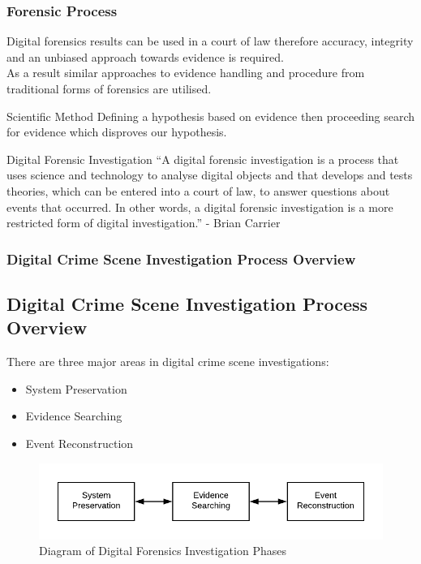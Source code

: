 \documentclass{beamer}
\begin{document}
\begin{frame}
	\frametitle{Forensic Process}
	Digital forensics results can be used in a court of law therefore accuracy, integrity and an unbiased approach towards evidence is required.\\
	As a result similar approaches to evidence handling and procedure from traditional forms of forensics are utilised.   
	\begin{block}{Scientific Method}
		Defining a hypothesis based on evidence then proceeding search for evidence which disproves our hypothesis.
	\end{block}
	\begin{block}{Digital Forensic Investigation}
	``A digital forensic investigation is a process that uses science
     and technology to analyse digital objects and that develops and
     tests theories, which can be entered into a court of law, to
     answer questions about events that occurred. In other words, a
     digital forensic investigation is a more restricted form of
     digital investigation.'' - Brian Carrier
	\end{block}
\end{frame}

\begin{frame}[fragile]
	\frametitle{Digital Crime Scene Investigation Process Overview}
	\subsection*{Digital Crime Scene Investigation Process Overview}
	There are three major areas in digital crime scene investigations:
	\begin{itemize}
		\item System Preservation
		\item Evidence Searching
		\item Event Reconstruction
	\end{itemize}
	\begin{figure}
		\includegraphics[scale=1]{df-guidelines}
		\caption{Diagram of Digital Forensics Investigation Phases}
		\label{fig:df-guidelines}
	\end{figure}
\end{frame}
\end{document}
